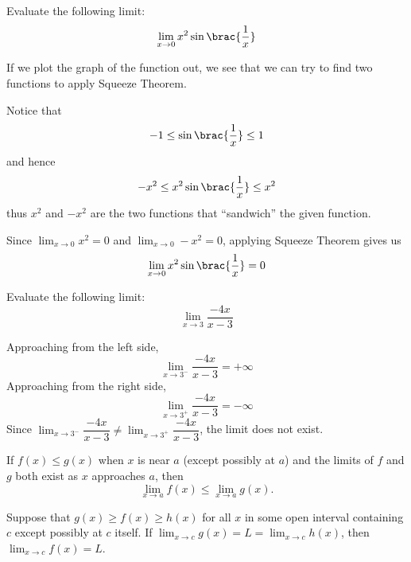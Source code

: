 \begin{exercise}
Evaluate the following limit:
\[ \lim_{x\to 0} x^2\sin\brac{\frac{1}{x}} \]
\end{exercise}

\begin{solution}
If we plot the graph of the function out, we see that we can try to find two functions to apply Squeeze Theorem.

Notice that \[ -1 \le \sin\brac{\frac{1}{x}} \le 1 \]
and hence
\[ -x^2 \le x^2\sin\brac{\frac{1}{x}} \le x^2 \]
thus $x^2$ and $-x^2$ are the two functions that ``sandwich'' the given function.

Since $\lim_{x\to 0}x^2=0$ and $\lim_{x\to 0}-x^2=0$, applying Squeeze Theorem gives us 
\[ \lim_{x\to 0} x^2\sin\brac{\frac{1}{x}} = 0 \]
\end{solution}

\begin{exercise}
Evaluate the following limit:
\[ \lim_{x\to 3}\frac{-4x}{x-3} \]
\end{exercise}

\begin{solution}
Approaching from the left side,
\[ \lim_{x\to 3^-}\frac{-4x}{x-3} = +\infty \]
Approaching from the right side,
\[ \lim_{x\to 3^+}\frac{-4x}{x-3} = -\infty \]
Since $\lim_{x\to 3^-}\dfrac{-4x}{x-3} \neq \lim_{x\to 3^+}\dfrac{-4x}{x-3}$, the limit does not exist.
\end{solution}

\begin{theorem}
If $f(x) \le g(x)$ when $x$ is near $a$ (except possibly at $a$) and the limits of $f$ and $g$ both exist as $x$ approaches $a$, then
\[ \lim_{x\to a}f(x) \le \lim_{x\to a}g(x). \]
\end{theorem}

\begin{theorem}
Suppose that $g(x) \ge f(x) \ge h(x)$ for all $x$ in some open interval containing $c$ except possibly at $c$ itself. If $\lim_{x\to c} g(x) = L = \lim_{x\to c} h(x)$, then $\lim_{x\to c} f(x) = L$.
\end{theorem}

